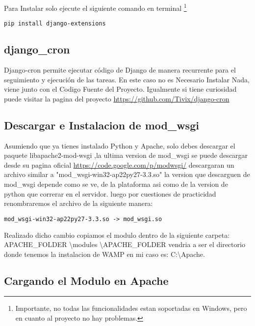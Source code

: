 Para Instalar solo ejecute el siguiente comando en terminal \footnote{Importante, no todas las funcionalidades
estan soportadas en Windows, pero en cuanto al proyecto no hay problemas.}

\begin{lstlisting}[style=consola]
     pip install django-extensions
\end{lstlisting}
\vspace{0.1cm}


\subsection{django\_cron}

Django-cron permite ejecutar código de Django de manera recurrente para el
seguimiento y ejecución de las tareas. En este caso no es Necesario Instalar
Nada, viene junto con el Codigo Fuente del Proyecto. Igualmente si tiene curiosidad
puede visitar la pagina del proyecto \url{https://github.com/Tivix/django-cron}

\subsection{Descargar e Instalacion de mod\_wsgi}

 Asumiendo que ya  tienes instalado Python y Apache, solo debes descargar el paquete
 libapache2-mod-wsgi ,la ultima version de mod\_wsgi se puede descargar desde su
 pagina oficial \url{https://code.google.com/p/modwsgi/} descargaran un archivo
 similar a "mod\_wsgi-win32-ap22py27-3.3.so" la version que descarguen de mod\_wsgi
 depende como se ve, de la plataforma asi como de la version de python que
 correrar en el servidor. luego por cuestiones de practicidad renombraremos
 el archivo de la siguiente manera:

\begin{lstlisting}[style=consola]
    mod_wsgi-win32-ap22py27-3.3.so -> mod_wsgi.so
\end{lstlisting}
\vspace{0.1cm}

Realizado dicho cambio copiamos el modulo dentro de la siguiente carpeta:
APACHE\_FOLDER \textbackslash modules \textbackslash APACHE\_FOLDER vendria a
ser el directorio donde tenemos la instalacion de WAMP en mi caso es:
C:\textbackslash Apache.

\subsection{Cargando el Modulo en Apache}

